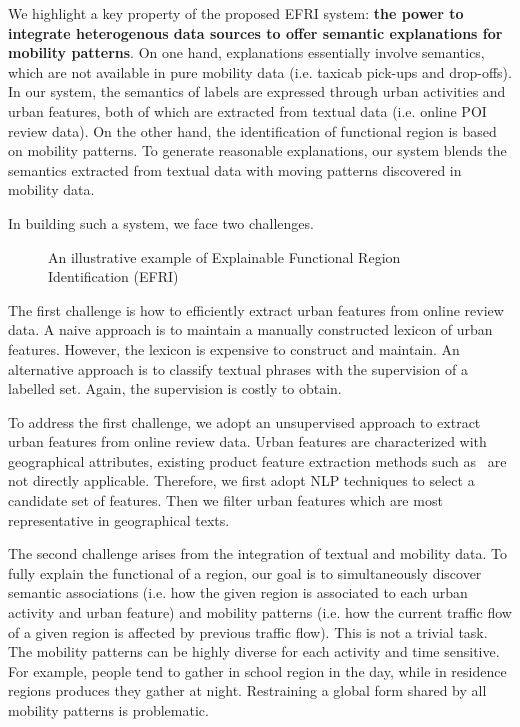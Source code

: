 \documentclass[runningheads]{llncs}
\begin{document}
We highlight a key property of the proposed EFRI system: \textbf{the power to integrate heterogenous data sources to offer semantic explanations for mobility patterns}. On one hand, explanations essentially involve semantics, which are not available in pure mobility data (i.e. taxicab pick-ups and drop-offs). In our system, the semantics of labels are expressed through urban activities and urban features, both of which are extracted from textual data (i.e. online POI review data). On the other hand, the identification of functional region is based on mobility patterns. To generate reasonable explanations, our system blends the semantics extracted from textual data with moving patterns discovered in mobility data. 

In building such a system, we face two challenges.

\begin{figure}
\centering
\caption{An illustrative example of Explainable Functional Region Identification (EFRI)}
\label{explanation-example} %
\end{figure}

The first challenge is how to efficiently extract urban features from online review data.
A naive approach is to maintain a manually constructed lexicon of urban features.
However, the lexicon is expensive to construct and maintain.
An alternative approach is to classify textual phrases with the supervision of a labelled set.
Again, the supervision is costly to obtain.

To address the first challenge, we adopt an unsupervised approach to extract urban features from online review data.
Urban features are characterized with geographical attributes, existing product feature extraction methods such as~\cite{Lu2011Label} are not directly applicable.
Therefore, we first adopt NLP techniques to select a candidate set of features.  
Then we filter urban features which are most representative in geographical texts.

The second challenge arises from the integration of textual and mobility data.
To fully explain the functional of a region, our goal is to simultaneously discover semantic associations (i.e. how the given region is associated to each urban activity and urban feature) and mobility patterns (i.e. how the current traffic flow of a given region is affected by previous traffic flow).
This is not a trivial task.
The mobility patterns can be highly diverse for each activity and time sensitive.
For example, people tend to gather in school region in the day, while in residence regions produces they gather at night.
Restraining a global form shared by all mobility patterns is problematic.
\end{document}
